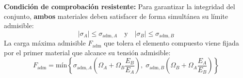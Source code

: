 {    \textbf{Condición de comprobación resistente:} Para garantizar la integridad del conjunto, \textbf{ambos} materiales deben satisfacer de forma simultánea su límite admisible:
    \begin{equation}
        |\sigma_A| \le \sigma_{\text{adm},A} \quad \text{y} \quad |\sigma_B| \le \sigma_{\text{adm},B}
    \end{equation}
    La carga máxima admisible $F_{\text{adm}}$ que tolera el elemento compuesto viene fijada por el primer material que alcance su tensión admisible:
    \begin{equation}
        F_{\text{adm}} = \text{mín} \left\{ \sigma_{\text{adm},A} \left( \Omega_A + \Omega_B \frac{E_B}{E_A} \right), \; \sigma_{\text{adm},B} \left( \Omega_B + \Omega_A \frac{E_A}{E_B} \right) \right\}
    \end{equation}
}





